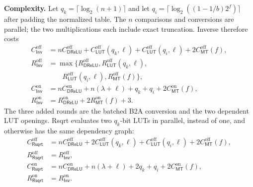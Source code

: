 \documentclass[journal]{IEEEtran}
\theoremstyle{definition}
\theoremstyle{plain}
\newcommand{\DReLU}{\mathsf{DReLU}}
\begin{document}
\textbf{Complexity.} Let $q_k=\lceil\log_2(n+1)\rceil$ and let
$q_i=\lceil\log_2((1-1/b)2^f)\rceil$ after padding the normalized table. The
$n$ comparisons and conversions are parallel; the two multiplications each
include exact truncation. Inverse therefore costs
\begin{equation}
\begin{aligned}
C^{\mathrm{off}}_{\mathsf{Inv}}
 &=nC^{\mathrm{off}}_{\DReLU}
   +C^{\mathrm{off}}_{\mathsf{LUT}}(q_k,\ell)
   +C^{\mathrm{off}}_{\mathsf{LUT}}(q_i,\ell)
   +2C^{\mathrm{off}}_{\mathsf{MT}}(f),\\
R^{\mathrm{off}}_{\mathsf{Inv}}
 &=\max\{R^{\mathrm{off}}_{\DReLU},
          R^{\mathrm{off}}_{\mathsf{LUT}}(q_k,\ell),\\
 &\qquad R^{\mathrm{off}}_{\mathsf{LUT}}(q_i,\ell),
          R^{\mathrm{off}}_{\mathsf{MT}}(f)\},\\
C^{\mathrm{on}}_{\mathsf{Inv}}
 &=nC^{\mathrm{on}}_{\DReLU}+n(\lambda+\ell)+q_k+q_i
   +2C^{\mathrm{on}}_{\mathsf{MT}}(f),\\
R^{\mathrm{on}}_{\mathsf{Inv}}
 &=R^{\mathrm{on}}_{\DReLU}+2R^{\mathrm{on}}_{\mathsf{MT}}(f)+3.
\end{aligned}
\label{eq:inverse-cost}
\end{equation}
The three added rounds are the batched B2A conversion and the two dependent
LUT openings. Rsqrt evaluates two $q_k$-bit LUTs in parallel, instead of one,
and otherwise has the same dependency graph:
\begin{equation}
\begin{aligned}
C^{\mathrm{off}}_{\mathsf{Rsqrt}}
 &=nC^{\mathrm{off}}_{\DReLU}
   +2C^{\mathrm{off}}_{\mathsf{LUT}}(q_k,\ell)
   +C^{\mathrm{off}}_{\mathsf{LUT}}(q_i,\ell)
   +2C^{\mathrm{off}}_{\mathsf{MT}}(f),\\
R^{\mathrm{off}}_{\mathsf{Rsqrt}}
 &=R^{\mathrm{off}}_{\mathsf{Inv}},\\
C^{\mathrm{on}}_{\mathsf{Rsqrt}}
 &=nC^{\mathrm{on}}_{\DReLU}+n(\lambda+\ell)+2q_k+q_i
   +2C^{\mathrm{on}}_{\mathsf{MT}}(f),\\
R^{\mathrm{on}}_{\mathsf{Rsqrt}}
 &=R^{\mathrm{on}}_{\mathsf{Inv}}.
\end{aligned}
\label{eq:rsqrt-cost}
\end{equation}
\end{document}
